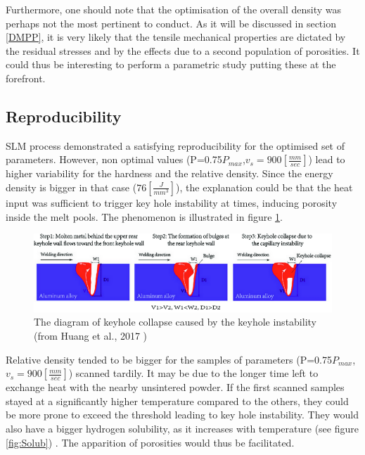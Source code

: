 Furthermore, one should note that the optimisation of the overall density was perhaps not the most pertinent to conduct. As it will be discussed in section \ref{DMPP}, it is very likely that the tensile mechanical properties are dictated by the residual stresses and by the effects due to a second population of porosities. It could thus be interesting to perform a parametric study putting these at the forefront.\\ 

\subsection{Reproducibility}

SLM process demonstrated a satisfying reproducibility for the optimised set of parameters. However, non optimal values (P=0.75$P_{max}$,$v_s=900 [\frac{mm}{sec}]$) lead to higher variability for the hardness and the relative density. Since the energy density is bigger in that case ($76[\frac{J}{mm^3}]$), the explanation could be that the heat input was sufficient to trigger key hole instability at times, inducing porosity inside the melt pools. The phenomenon is illustrated in figure \ref{fig:KHI}. \\

\begin{figure}[ht]
	\centering
	\centerline{\includegraphics[scale=0.52]{Images/KHI}}
	\decoRule
	\caption[The diagram of keyhole collapse caused by the keyhole instability.]{The diagram of keyhole collapse caused by the keyhole instability (from Huang et al., 2017 \parencite{Huang2017})}
	\label{fig:KHI}
\end{figure}

Relative density tended to be bigger for the samples of parameters (P=0.75$P_{max}$,$v_s=900 [\frac{mm}{sec}]$) scanned tardily. It may be due to the longer time left to exchange heat with the nearby unsintered powder. If the first scanned samples stayed at a significantly higher temperature compared to the others, they could be more prone to exceed the threshold leading to key hole instability. They would also have a bigger hydrogen solubility, as it increases with temperature (see figure \ref{fig:Solub}) \parencite{Verhaeghe}. The apparition of porosities would thus be facilitated. \\

